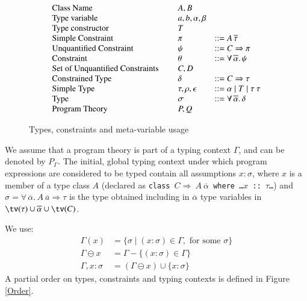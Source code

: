 \documentclass[review]{elsarticle}
\begin{document}
\begin{figure}[Types, constraints and meta-variable usage]

\[ \begin{array}[c]{llll}
\textrm{Class Name}         &\hspace{.1cm}   & A,B      & \\
\textrm{Type variable}      &                & a, b, \alpha,\beta   & \\
\textrm{Type constructor}   &                & T                    & \\
\textrm{Simple Constraint}  &                & \pi                  & ::= A\,\overline{\tau}\\
\textrm{Unquantified Constraint} &           & \psi                 & ::= C\Rightarrow \pi\\
\textrm{Constraint}         &                & \theta               & ::= \forall\,\overline{\alpha}.\,\psi\\
\textrm{Set of Unquantified Constraints} &   & C,D                  & \\
\textrm{Constrained Type}   &                & \delta               & ::= C\Rightarrow \tau\\
\textrm{Simple Type}        &                & \tau, \rho, \epsilon & ::= \alpha \mid T \mid \tau\:\tau \\
\textrm{Type}               &                & \sigma               & ::= \forall\,\overline{\alpha}.\,\delta\\
\textrm{Program Theory}     &                & P,Q                  &
  \end{array} \]
\caption{Types, constraints and meta-variable usage}
\label{Core-Haskell-types}
\end{figure}

We assume that a program theory is part of a typing context $\Gamma$,
and can be denoted by $P_\Gamma$.
The initial, global typing context under which program expressions are
considered to be typed contain all assumptions $x:\sigma$, where $x$
is a member of a type class $A$ (declared as
  {\tt class $C \Rightarrow\ A\:\overline{\alpha}$ where \ldots $x$ :: $\tau$\ldots})
and $\sigma = \forall\,\overline{\alpha}.\,A\:
\overline{a}\Rightarrow\tau$ is the type obtained including in
$\overline{\alpha}$ type variables in $\tv(\tau)\cup \overline{\alpha}
\cup \tv(C)$.

We use:
  \[ \begin{array}{ll}
       \Gamma(x)        & = \{ \sigma \mid (x:\sigma) \in \Gamma, \text{ for some } \sigma \}\\
       \Gamma \ominus x & = \Gamma - \{ (x:\sigma) \in \Gamma \}\\
       \Gamma, x:\sigma & = (\Gamma \ominus x) \cup \{ x:\sigma \}
     \end{array}
  \]
A partial order on types, constraints and typing contexts is defined
in Figure \ref{Order}.
\end{document}
